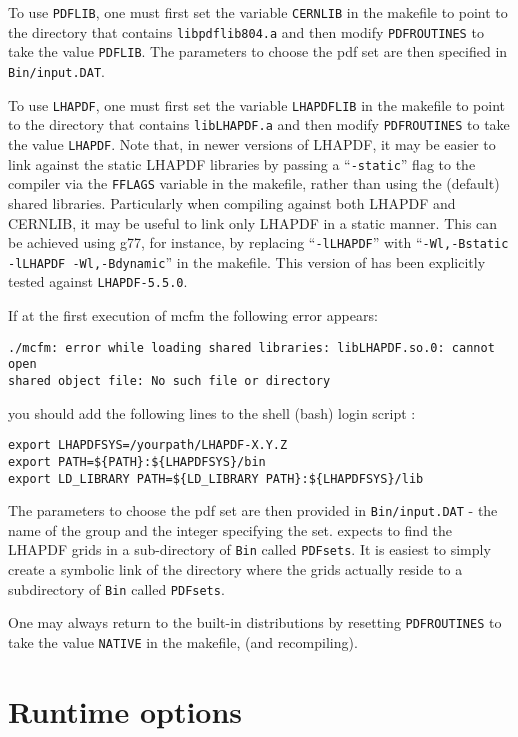 \documentclass[12pt]{article}
\begin{document}
To use {\tt PDFLIB}, one must first set the variable {\tt CERNLIB}
in the makefile to point to the directory that contains
{\tt libpdflib804.a} and then modify {\tt PDFROUTINES} to
take the value {\tt PDFLIB}. The parameters to choose the
pdf set are then specified in {\tt Bin/input.DAT}.

To use {\tt LHAPDF}, one must first set the variable {\tt LHAPDFLIB}
in the makefile to point to the directory that contains
{\tt libLHAPDF.a} and then modify {\tt PDFROUTINES} to
take the value {\tt LHAPDF}. Note that, in newer versions of LHAPDF,
it may be easier to link against the static LHAPDF libraries by passing
a ``{\tt -static}'' flag to the compiler via the {\tt FFLAGS} variable
in the makefile, rather than using the (default) shared libraries.
Particularly when compiling against both LHAPDF and CERNLIB, it may
be useful to link only LHAPDF in a static manner. This can be achieved
using g77, for instance, by replacing
 ``{\tt -lLHAPDF}'' with ``{\tt -Wl,-Bstatic -lLHAPDF -Wl,-Bdynamic}''
in the makefile. This version of \MCFM has been explicitly tested
against {\tt LHAPDF-5.5.0}.

If at the first execution of mcfm the following error appears:
\begin{verbatim}
./mcfm: error while loading shared libraries: libLHAPDF.so.0: cannot open
shared object file: No such file or directory
\end{verbatim}

you should add the following lines to the shell (bash) login script :
\begin{verbatim}
export LHAPDFSYS=/yourpath/LHAPDF-X.Y.Z
export PATH=${PATH}:${LHAPDFSYS}/bin
export LD_LIBRARY PATH=${LD_LIBRARY PATH}:${LHAPDFSYS}/lib
\end{verbatim}

The parameters to choose the
pdf set are then provided in {\tt Bin/input.DAT} - 
the name of the group and the integer specifying 
the set.
\MCFM expects to find the LHAPDF grids in a sub-directory of {\tt Bin} called
{\tt PDFsets}. It is easiest to simply create a symbolic link of the directory where the
grids actually reside to a subdirectory of {\tt Bin} called {\tt PDFsets}.

One may always return to the built-in distributions by resetting
{\tt PDFROUTINES} to take the value {\tt NATIVE}  in the makefile,
(and recompiling).

\section{Runtime options}
\end{document}

